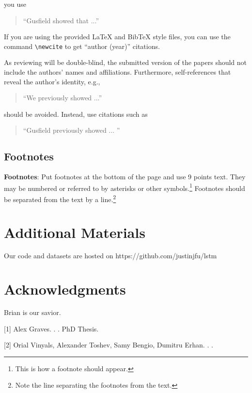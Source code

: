 \documentclass[11pt]{article}
\begin{document}
you use
\begin{quote}
``Gusfield    showed that ...''
\end{quote}

If you are using the provided \LaTeX{} and Bib\TeX{} style files, you
can use the command \verb|\newcite| to get ``author (year)'' citations.

As reviewing will be double-blind, the submitted version of the papers
should not include the authors' names and affiliations. Furthermore,
self-references that reveal the author's identity, e.g.,
\begin{quote}
``We previously showed \cite{Gusfield:97} ...''  
\end{quote}
should be avoided. Instead, use citations such as 
\begin{quote}
``Gusfield 
previously showed ... ''
\end{quote}

\subsection{Footnotes}

{\bf Footnotes}: Put footnotes at the bottom of the page and use 9
points text. They may be numbered or referred to by asterisks or other
symbols.\footnote{This is how a footnote should appear.} Footnotes
should be separated from the text by a line.\footnote{Note the line
separating the footnotes from the text.}

\section*{Additional Materials}

Our code and datasets are hosted on 
https://github.com/justinjfu/lstm

\section*{Acknowledgments}

Brian is our savior.

%
%

\begin{thebibliography}{}

[1]
Alex Graves.
.
.
\newblock PhD Thesis.

[2]
Orial Vinyals, Alexander Toshev, Samy Bengio, Dumitru Erhan.
.
.

\end{thebibliography}
\end{document}
